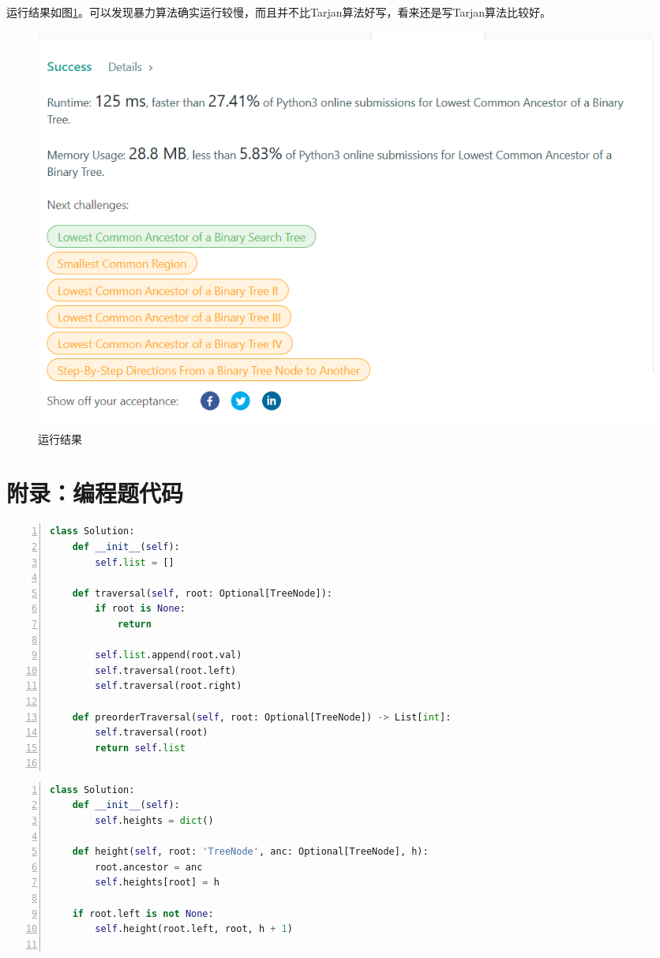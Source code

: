 \documentclass[a4paper,twoside]{article}
\begin{document}
\begin{spacing}{1.2}
运行结果如图\ref{fig:lc236}。可以发现暴力算法确实运行较慢，而且并不比Tarjan算法好写，看来还是写Tarjan算法比较好。


\begin{figure}[h]
	\centering
	\label{fig:lc236}
	\caption{运行结果}
	\includegraphics[width=0.8\linewidth]{lc236.png}
\end{figure}


\newpage
\clearpage

\appendix


\section{附录：编程题代码}
\label{sec:code}

\begin{lstlisting}[language=Python,numbers=left,style=PythonStyle,caption=求先序遍历,label={code:lc144}]
class Solution:
	def __init__(self):
		self.list = []
	
	def traversal(self, root: Optional[TreeNode]):
		if root is None:
			return
		
		self.list.append(root.val)
		self.traversal(root.left)
		self.traversal(root.right)
	
	def preorderTraversal(self, root: Optional[TreeNode]) -> List[int]:
		self.traversal(root)
		return self.list
	
\end{lstlisting}

\begin{lstlisting}[language=Python,numbers=left,style=PythonStyle,caption=求LCA,label={code:lc236}]
class Solution:
	def __init__(self):
		self.heights = dict()
	
	def height(self, root: 'TreeNode', anc: Optional[TreeNode], h):
		root.ancestor = anc
		self.heights[root] = h
	
	if root.left is not None:
		self.height(root.left, root, h + 1)
	

\end{lstlisting}
\end{spacing}
\end{document}
